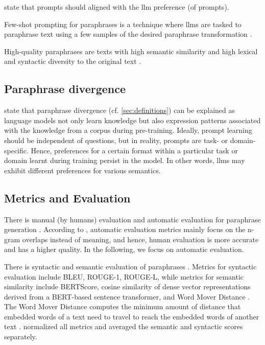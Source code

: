 \citet{zhou_paraphrase_2025} state that prompts should aligned with the \ac{llm} preference (of prompts).

Few-shot prompting for paraphrases is a technique where \acp{llm} are tasked to paraphrase text using a few samples of the desired paraphrase transformation \citep{zhou_paraphrase_2025}.

High-quality paraphrases are texts with high semantic similarity and high lexical and syntactic diversity to the original text \citep{gohsen_captions_2023}.


\subsection{Paraphrase divergence}
\citet{fu_learning_2024} state that paraphrase divergence (cf. \autoref{sec:definitions}) can be explained as language models 
not only learn knowledge but also expression patterns associated with the knowledge from a corpus during pre-training.
Ideally, prompt learning should be independent of questions, but in reality, prompts are task- or domain-specific.
Hence, preferences for a certain format within a particular task or domain learnt during training persist in the model.
In other words, \acp{llm} may exhibit different preferences for various semantics.


\subsection{Metrics and Evaluation}
There is manual (by humans) evaluation and automatic evaluation for paraphrase generation \citep{fu_learning_2024,zhou_paraphrase_2021}.
According to \citet{zhou_paraphrase_2021}, automatic evaluation metrics mainly focus on the n-gram overlaps instead of meaning, 
and hence, human evaluation is more accurate and has a higher quality.
In the following, we focus on automatic evaluation.

There is syntactic and semantic evaluation of paraphrases \citep{gohsen_captions_2023}.
Metrics for syntactic evaluation include BLEU, ROUGE-1, ROUGE-L, 
while metrics for semantic similarity include BERTScore, 
cosine similarity of dense vector representations derived from a BERT-based sentence transformer, 
and Word Mover Distance \citep{gohsen_captions_2023}.
The Word Mover Distance computes the minimum amount of distance that embedded words of a text need to travel 
to reach the embedded words of another text \citep{gohsen_captions_2023}.
\citet{gohsen_captions_2023} normalized all metrics and averaged the semantic and syntactic scores separately.


